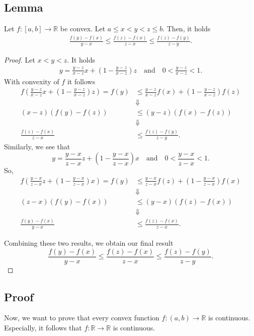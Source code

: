 \documentclass[12pt,letterpaper]{article}
\begin{document}
\subsection*{Lemma}
Let $f: [a,b] \to \mathbb{R}$ be convex. Let $a \leq x < y < z \leq b$. Then, it holds
\begin{align*}
    \frac{f(y)-f(x)}{y-x} \leq \frac{f(z)-f(x)}{z-x} \leq \frac{f(z)-f(y)}{z-y}.
\end{align*}
\begin{proof}
    Let $x < y < z$. It holds
    \begin{align*}
        y = \frac{y - z}{x - z}x + \left(1 - \frac{y - z}{x - z}\right)z \quad \text{and} \quad 0 < \frac{y - z}{x - z} < 1.
    \end{align*}
    With convexity of $f$ it follows
    \begin{align*}
        f\left(\frac{y - z}{x - z}x + (1 - \frac{y - z}{x - z})z \right) = f(y) 
        &\leq \frac{y - z}{x - z} f(x) + (1 - \frac{y - z}{x - z})f(z) \\
        &\Downarrow \\
        (x-z)(f(y)-f(z)) & \leq (y-z)(f(x) - f(z)) \\
        &\Downarrow \\
        \frac{f(z)-f(x)}{z-x} &\leq \frac{f(z)-f(y)}{z-y}.
    \end{align*} 
    Similarly, we see that 
    \[
        y = \frac{y-x}{z - x}z + \left(1 - \frac{y - x}{z - x}\right)x \quad \text{and} \quad 0 < \frac{y - x}{z - x} < 1.
    \] 
    So,
    \begin{align*}
        f\left(\frac{y - x}{z - x}z + (1 - \frac{y - x}{z - x})x \right) = f(y) 
        &\leq \frac{y - x}{z - x} f(z) + (1 - \frac{y - x}{z - x})f(x) \\
        &\Downarrow \\
        (z-x)(f(y)-f(x)) & \leq (y-x)(f(z) - f(x)) \\
        &\Downarrow \\
        \frac{f(y)-f(x)}{y-x} &\leq \frac{f(z)-f(x)}{z-x}.
    \end{align*} 

    Combining these two results, we obtain our final result
    \[
        \frac{f(y)-f(x)}{y-x} \leq \frac{f(z)-f(x)}{z-x} \leq \frac{f(z)-f(y)}{z-y}.
    \]
\end{proof}

\subsection*{Proof}
Now, we want to prove that every convex function $f: (a,b) \to \mathbb R$ is continuous. Especially, it follows that $f: \mathbb R \to \mathbb{R}$ is continuous.
\end{document}
